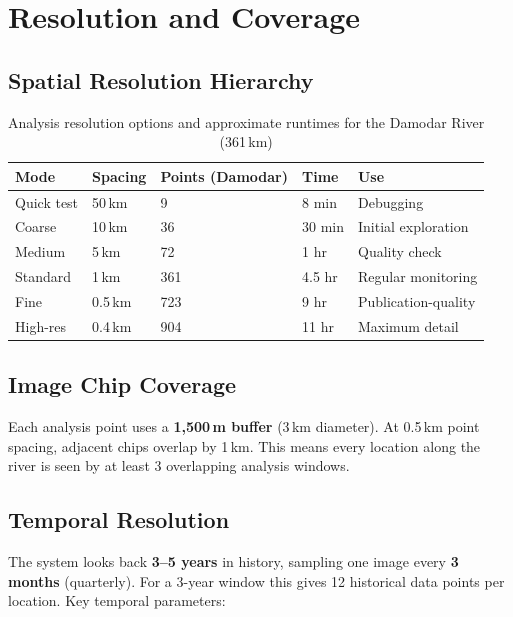 \documentclass[12pt, a4paper]{article}
\begin{document}
\section{Resolution and Coverage}

\subsection{Spatial Resolution Hierarchy}

\begin{table}[H]
\centering
\begin{tabular}{lllll}
\toprule
\textbf{Mode} & \textbf{Spacing} & \textbf{Points (Damodar)} & \textbf{Time} & \textbf{Use} \\
\midrule
Quick test & 50\,km & 9 & 8 min & Debugging \\
Coarse & 10\,km & 36 & 30 min & Initial exploration \\
Medium & 5\,km & 72 & 1 hr & Quality check \\
Standard & 1\,km & 361 & 4.5 hr & Regular monitoring \\
Fine & 0.5\,km & 723 & 9 hr & Publication-quality \\
High-res & 0.4\,km & 904 & 11 hr & Maximum detail \\
\bottomrule
\end{tabular}
\caption{Analysis resolution options and approximate runtimes for the Damodar River (361\,km)}
\end{table}

\subsection{Image Chip Coverage}

Each analysis point uses a \textbf{1,500\,m buffer} (3\,km diameter).
At 0.5\,km point spacing, adjacent chips overlap by 1\,km. This means
every location along the river is seen by at least 3 overlapping
analysis windows.

\subsection{Temporal Resolution}

The system looks back \textbf{3--5 years} in history, sampling one
image every \textbf{3 months} (quarterly). For a 3-year window this
gives 12 historical data points per location. Key temporal parameters:
\end{document}
